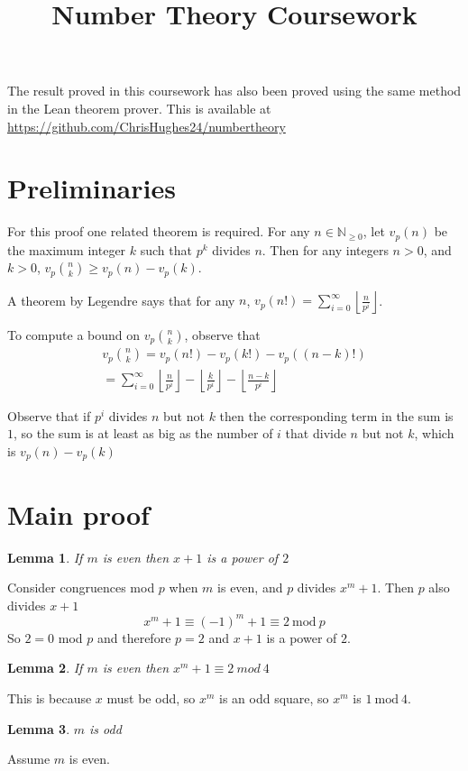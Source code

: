 \documentclass[11pt]{article} %
\title{Number Theory Coursework}
\date{}
\newtheorem{lemma}{Lemma}
\begin{document}
\maketitle

The result proved in this coursework has also been proved using the same method in the Lean theorem prover. This is available at
\url{https://github.com/ChrisHughes24/numbertheory}

\section{Preliminaries}

For this proof one related theorem is required. For any $n \in \mathbb{N}_{\ge0}$, let
$v_p(n)$ be the maximum integer $k$ such that $p^k$ divides $n$. Then for any integers $n > 0$, and $k > 0$,
$v_p{{n}\choose{k}} \ge v_p(n) - v_p(k)$.

A theorem by Legendre says that for any $n$, $v_p(n!) = \sum_{i=0}^{\infty} \left\lfloor\frac{n}{p^i}\right\rfloor $.

To compute a bound on $v_p{{n}\choose{k}}$, observe that
\begin{equation}
  \begin{aligned}
    v_p{{n}\choose{k}} = v_p(n!) - v_p(k!) - v_p ((n-k)!) \\
    = \sum_{i=0}^{\infty} \left\lfloor\frac{n}{p^i}\right\rfloor - \left\lfloor\frac{k}{p^i}\right\rfloor
      - \left\lfloor\frac{n-k}{p^i}\right\rfloor
  \end{aligned}
\end{equation}

Observe that if $p^i$ divides $n$ but not $k$ then the corresponding term in the sum is $1$,
so the sum is at least as big as the number of $i$ that divide $n$ but not $k$, which is
$v_p(n) - v_p(k)$

\section{Main proof}
\begin{lemma}\label{lem:even2}
  If $m$ is even then $x+1$ is a power of $2$
\end{lemma}
Consider congruences mod $p$ when $m$ is even, and $p$ divides $x^m+1$. Then $p$ also divides $x+1$
\begin{equation}
  x^m + 1 \equiv (-1)^m + 1 \equiv 2 \ \text{mod} \ p
\end{equation}
So $2 = 0$ mod $p$ and therefore $p = 2$ and $x + 1$ is a power of $2$.
\begin{lemma}\label{lem:2mod4}
  If $m$ is even then $x^m + 1 \equiv 2 \ mod \ 4$
\end{lemma}
  This is because $x$ must be odd, so $x^m$ is an odd square, so $x^m$ is $1 \ \text{mod} \ 4$.
\begin{lemma}
  $m$ is odd
\end{lemma}
Assume $m$ is even.
\end{document}
